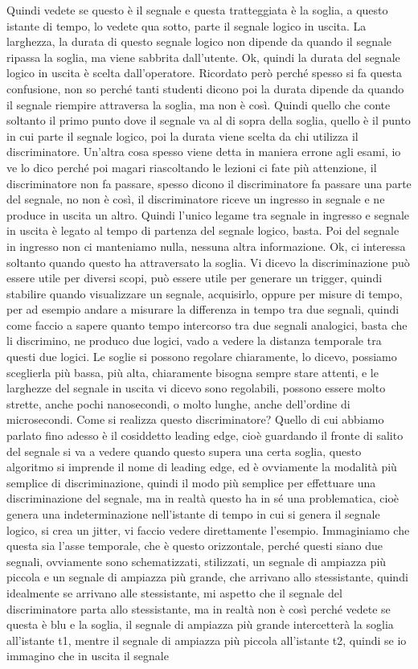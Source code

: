 {Quindi vedete se questo è il segnale e questa tratteggiata è la soglia, a questo istante di tempo, lo vedete qua sotto, parte il segnale logico in uscita. La larghezza, la durata di questo segnale logico non dipende da quando il segnale ripassa la soglia, ma viene sabbrita dall'utente. Ok, quindi la durata del segnale logico in uscita è scelta dall'operatore. Ricordato però perché spesso si fa questa confusione, non so perché tanti studenti dicono poi la durata dipende da quando il segnale riempire attraversa la soglia, ma non è così. Quindi quello che conte soltanto il primo punto dove il segnale va al di sopra della soglia, quello è il punto in cui parte il segnale logico, poi la durata viene scelta da chi utilizza il discriminatore. Un'altra cosa spesso viene detta in maniera errone agli esami, io ve lo dico perché poi magari riascoltando le lezioni ci fate più attenzione, il discriminatore non fa passare, spesso dicono il discriminatore fa passare una parte del segnale, no non è così, il discriminatore riceve un ingresso in segnale e ne produce in uscita un altro. Quindi l'unico legame tra segnale in ingresso e segnale in uscita è legato al tempo di partenza del segnale logico, basta. Poi del segnale in ingresso non ci manteniamo nulla, nessuna altra informazione. Ok, ci interessa soltanto quando questo ha attraversato la soglia. Vi dicevo la discriminazione può essere utile per diversi scopi, può essere utile per generare un trigger, quindi stabilire quando visualizzare un segnale, acquisirlo, oppure per misure di tempo, per ad esempio andare a misurare la differenza in tempo tra due segnali, quindi come faccio a sapere quanto tempo intercorso tra due segnali analogici, basta che li discrimino, ne produco due logici, vado a vedere la distanza temporale tra questi due logici. Le soglie si possono regolare chiaramente, lo dicevo, possiamo sceglierla più bassa, più alta, chiaramente bisogna sempre stare attenti, e le larghezze del segnale in uscita vi dicevo sono regolabili, possono essere molto strette, anche pochi nanosecondi, o molto lunghe, anche dell'ordine di microsecondi. Come si realizza questo discriminatore? Quello di cui abbiamo parlato fino adesso è il cosiddetto leading edge, cioè guardando il fronte di salito del segnale si va a vedere quando questo supera una certa soglia, questo algoritmo si imprende il nome di leading edge, ed è ovviamente la modalità più semplice di discriminazione, quindi il modo più semplice per effettuare una discriminazione del segnale, ma in realtà questo ha in sé una problematica, cioè genera una indeterminazione nell'istante di tempo in cui si genera il segnale logico, si crea un jitter, vi faccio vedere direttamente l'esempio. Immaginiamo che questa sia l'asse temporale, che è questo orizzontale, perché questi siano due segnali, ovviamente sono schematizzati, stilizzati, un segnale di ampiazza più piccola e un segnale di ampiazza più grande, che arrivano allo stessistante, quindi idealmente se arrivano alle stessistante, mi aspetto che il segnale del discriminatore parta allo stessistante, ma in realtà non è così perché vedete se questa è blu e la soglia, il segnale di ampiazza più grande intercetterà la soglia all'istante t1, mentre il segnale di ampiazza più piccola all'istante t2, quindi se io immagino che in uscita il segnale }
